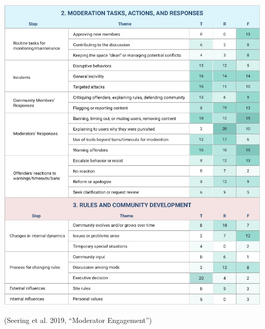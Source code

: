 \documentclass[nobackground,dvipsnames,table]{beamer}
\begin{document}
\begin{frame}{}

\begin{center}
   \includegraphics[scale=.425]{img/fig17.2.jpg} 
\end{center}

\scriptsize{\color{lightgray}(Seering et al. 2019, “Moderator Engagement”)}

\end{frame}
\end{document}
